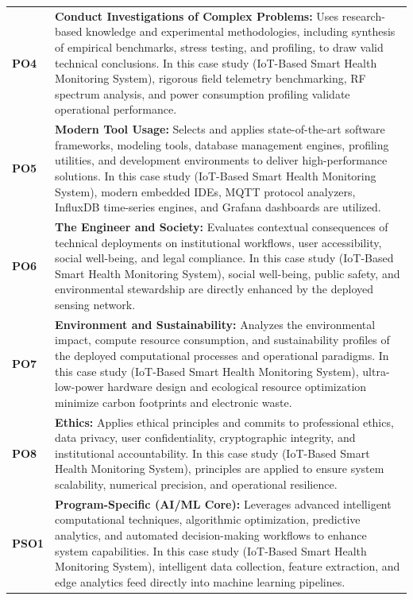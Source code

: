 {\begin{longtable}{@{}>{\centering\arraybackslash}p{1.8cm} p{13.2cm}@{}}
    \addlinespace
\textbf{PO4} & \textbf{Conduct Investigations of Complex Problems:} Uses research-based knowledge and experimental methodologies, including synthesis of empirical benchmarks, stress testing, and profiling, to draw valid technical conclusions. In this case study (IoT-Based Smart Health Monitoring System), rigorous field telemetry benchmarking, RF spectrum analysis, and power consumption profiling validate operational performance. \\
    \addlinespace
\textbf{PO5} & \textbf{Modern Tool Usage:} Selects and applies state-of-the-art software frameworks, modeling tools, database management engines, profiling utilities, and development environments to deliver high-performance solutions. In this case study (IoT-Based Smart Health Monitoring System), modern embedded IDEs, MQTT protocol analyzers, InfluxDB time-series engines, and Grafana dashboards are utilized. \\
    \addlinespace
\textbf{PO6} & \textbf{The Engineer and Society:} Evaluates contextual consequences of technical deployments on institutional workflows, user accessibility, social well-being, and legal compliance. In this case study (IoT-Based Smart Health Monitoring System), social well-being, public safety, and environmental stewardship are directly enhanced by the deployed sensing network. \\
    \addlinespace
\textbf{PO7} & \textbf{Environment and Sustainability:} Analyzes the environmental impact, compute resource consumption, and sustainability profiles of the deployed computational processes and operational paradigms. In this case study (IoT-Based Smart Health Monitoring System), ultra-low-power hardware design and ecological resource optimization minimize carbon footprints and electronic waste. \\
    \addlinespace
\textbf{PO8} & \textbf{Ethics:} Applies ethical principles and commits to professional ethics, data privacy, user confidentiality, cryptographic integrity, and institutional accountability. In this case study (IoT-Based Smart Health Monitoring System), principles are applied to ensure system scalability, numerical precision, and operational resilience. \\
    \addlinespace
\textbf{PSO1} & \textbf{Program-Specific (AI/ML Core):} Leverages advanced intelligent computational techniques, algorithmic optimization, predictive analytics, and automated decision-making workflows to enhance system capabilities. In this case study (IoT-Based Smart Health Monitoring System), intelligent data collection, feature extraction, and edge analytics feed directly into machine learning pipelines. \\

\end{longtable}}
